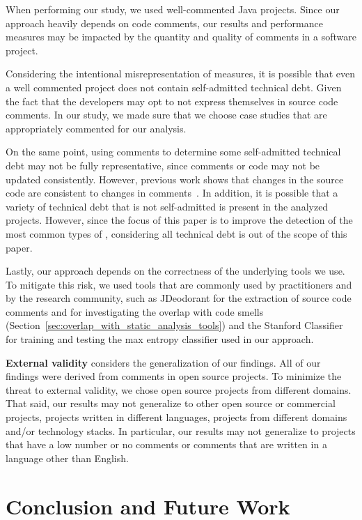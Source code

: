 When performing our study, we used well-commented Java projects. Since our approach heavily depends on code comments, our results and performance measures may be impacted by the quantity and quality of comments in a software project. 

Considering the intentional misrepresentation of measures, it is possible that even a well commented project does not contain self-admitted technical debt. Given the fact that the developers may opt to not express themselves in source code comments. In our study, we made sure that we choose case studies that are appropriately commented for our analysis.

On the same point, using comments to determine some self-admitted technical debt may not be fully representative, since comments or code may not be updated consistently. However, previous work shows that changes in the source code are consistent to changes in comments~\cite{Fluri2007WCRE,Potdar2014ICSME}. In addition, it is possible that a variety of technical debt that is not self-admitted is present in the analyzed projects. However, since the focus of this paper is to improve the detection of the most common types of \SATD, considering all technical debt is out of the scope of this paper.

Lastly, our approach depends on the correctness of the underlying tools we use. To mitigate this risk, we used tools that are commonly used by practitioners and by the research community, such as JDeodorant for the extraction of source code comments and for investigating the overlap with code smells (Section~\ref{sec:overlap_with_static_analysis_tools}) and the Stanford Classifier for training and testing the max entropy classifier used in our approach.

\noindent \textbf{External validity} considers the generalization of our findings. All of our findings were derived from comments in open source projects. To minimize the threat to external validity, we chose open source projects from different domains. That said, our results may not generalize to other open source or commercial projects, projects written in different languages, projects from different domains and/or technology stacks. In particular, our results may not generalize to projects that have a low number or no comments or comments that are written in a language other than English.

\section{Conclusion and Future Work}
\label{chap4:sec:conclusion}

